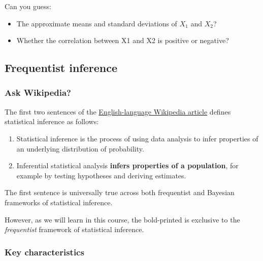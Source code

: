 \documentclass[
  11pt,
]{article}
\providecommand{\tightlist}{%
  \setlength{\itemsep}{0pt}\setlength{\parskip}{0pt}}
\begin{document}
Can you guess:

\begin{itemize}
\tightlist
\item
  The approximate means and standard deviations of \(X_1\) and \(X_2\)?
\item
  Whether the correlation between X1 and X2 is positive or negative?
\end{itemize}

\hypertarget{frequentist-inference}{%
\subsection{Frequentist inference}\label{frequentist-inference}}

\hypertarget{ask-wikipedia}{%
\subsubsection{Ask Wikipedia?}\label{ask-wikipedia}}

The first two sentences of the \href{https://en.wikipedia.org/wiki/Statistical_inference}{English-language Wikipedia article} defines statistical inference as follows:

\begin{enumerate}
\def\labelenumi{\arabic{enumi}.}
\tightlist
\item
  Statistical inference is the process of using data analysis to infer properties of an underlying distribution of probability.
\item
  Inferential statistical analysis \textbf{infers properties of a population}, for example by testing hypotheses and deriving estimates.
\end{enumerate}

The first sentence is universally true across both frequentist and Bayesian frameworks of statistical inference.

However, as we will learn in this course, the bold-printed is exclusive to the \emph{frequentist} framework of statistical inference.

\hypertarget{key-characteristics}{%
\subsubsection{Key characteristics}\label{key-characteristics}}
\end{document}
